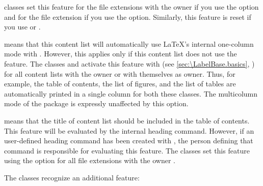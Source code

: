 \begin{description}
  \KOMAScript{} classes set this feature for the file extensions with the
  owner  if you use the
   option and for the file
  extension  if you use the
   option. Similarly, this feature
  is reset if you use %
   or
  .
\item[\PValue{onecolumn}] \leavevmode{}%
  means that this content list will automatically use \LaTeX's internal
  one-column mode with .
  However, this applies only if this content list does
  not use the  feature. The
  \KOMAScript{} classes  and  activate this
  feature with  (see
  \autoref{sec:\LabelBase.basics}, )
  for all content lists with the owner  or with themselves as
  owner. Thus, for example, the table of contents, the list of figures, and
  the list of tables are automatically printed in a single column for both
  these classes. The multicolumn mode of the
   package is expressly unaffected by
  this option.
\item[\PValue{totoc}] means that the title of content list should be included
  in the table of contents. This feature will be evaluated by the internal
  heading command. However, if an user-defined heading command has been
  created with , the person defining
  that command is responsible for evaluating this feature. The \KOMAScript{}
  classes set this feature using the %
   option for all file extensions with
  the owner .
\end{description}
The \KOMAScript{} classes recognize an additional feature:
